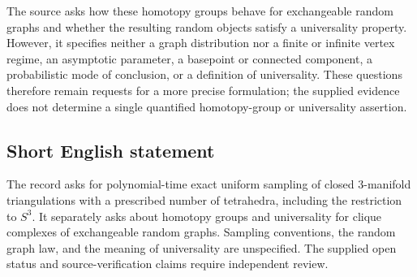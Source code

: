 \documentclass[11pt]{article}
\begin{document}
\begin{enumerate}
The source asks how these homotopy groups behave for exchangeable random graphs and whether the resulting random objects satisfy a universality property. However, it specifies neither a graph distribution nor a finite or infinite vertex regime, an asymptotic parameter, a basepoint or connected component, a probabilistic mode of conclusion, or a definition of universality. These questions therefore remain requests for a more precise formulation; the supplied evidence does not determine a single quantified homotopy-group or universality assertion.
\end{enumerate}
\subsection{Short English statement}
The record asks for polynomial-time exact uniform sampling of closed \(3\)-manifold triangulations with a prescribed number of tetrahedra, including the restriction to \(S^3\). It separately asks about homotopy groups and universality for clique complexes of exchangeable random graphs. Sampling conventions, the random graph law, and the meaning of universality are unspecified. The supplied open status and source-verification claims require independent review.
\end{document}
